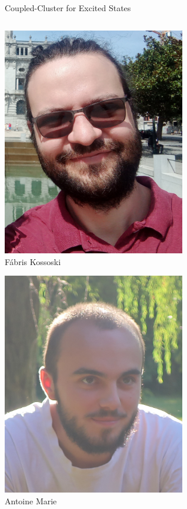 \documentclass[aspectratio=169,9pt]{beamer}
\begin{document}
\begin{frame}{Coupled-Cluster for Excited States}

                \begin{columns}
                \begin{column}{0.25\textwidth}
			\centering
\includegraphics[width=0.6\textwidth]{fig/Fabris_2021.png}
\\
Fábris Kossoski
\bigskip

			\centering
\includegraphics[width=0.6\textwidth]{fig/Antoine.jpg}
\\
Antoine Marie

                \end{column}


\end{columns}
\end{frame}
\end{document}

